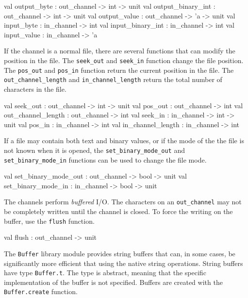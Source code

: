 \begin{ocaml}
val output_byte : out_channel -> int -> unit
val output_binary_int : out_channel -> int -> unit
val output_value : out_channel -> 'a -> unit
val input_byte : in_channel -> int
val input_binary_int : in_channel -> int
val input_value : in_channel -> 'a
\end{ocaml}


If the channel is a normal file, there are several functions that can modify the position in the
file. The \hbox{\lstinline/seek_out/} and \hbox{\lstinline/seek_in/} function change the file
position. The \hbox{\lstinline/pos_out/} and \hbox{\lstinline/pos_in/} function return the current
position in the file. The \hbox{\lstinline/out_channel_length/}
and \hbox{\lstinline/in_channel_length/} return the total number of characters in the file.

\begin{ocaml}
val seek_out : out_channel -> int -> unit
val pos_out : out_channel -> int
val out_channel_length : out_channel -> int
val seek_in : in_channel -> int -> unit
val pos_in : in_channel -> int
val in_channel_length : in_channel -> int
\end{ocaml}
%
If a file may contain both text and binary values, or if the mode of the the file is not known when
it is opened, the \hbox{\lstinline/set_binary_mode_out/} and \hbox{\lstinline/set_binary_mode_in/}
functions can be used to change the file mode.

\begin{ocaml}
val set_binary_mode_out : out_channel -> bool -> unit
val set_binary_mode_in : in_channel -> bool -> unit
\end{ocaml}
%
The channels perform \emph{buffered} I/O.  The characters on an \hbox{\lstinline/out_channel/} may
not be completely written until the channel is closed. To force the writing on the buffer, use the
\hbox{\lstinline/flush/} function.
%

\begin{ocaml}
val flush : out_channel -> unit
\end{ocaml}

%

The \hbox{\lstinline$Buffer$} library module provides string buffers that can, in some cases, be
significantly more efficient that using the native string operations. String buffers have
type \hbox{\lstinline/Buffer.t/}. The type is abstract, meaning that the specific
implementation of the buffer is not specified.  Buffers are created with
the \hbox{\lstinline/Buffer.create/} function.

